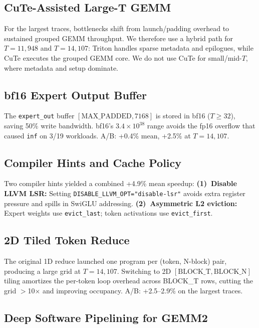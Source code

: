 \documentclass[11pt,twocolumn]{article}
\begin{document}
\subsection{CuTe-Assisted Large-T GEMM}

For the largest traces, bottlenecks shift from launch/padding overhead to sustained grouped GEMM throughput.
We therefore use a hybrid path for $T{=}11{,}948$ and $T{=}14{,}107$: Triton handles sparse metadata and epilogues, while CuTe executes the grouped GEMM core.
We do not use CuTe for small/mid-$T$, where metadata and setup dominate.

\subsection{bf16 Expert Output Buffer}

The \texttt{expert\_out} buffer $[\text{MAX\_PADDED}, 7168]$ is stored in bf16 ($T{\ge}32$), saving 50\% write bandwidth.
bf16's $3.4{\times}10^{38}$ range avoids the fp16 overflow that caused \texttt{inf} on 3/19 workloads.
A/B: +0.4\% mean, +2.5\% at $T{=}14{,}107$.

\subsection{Compiler Hints and Cache Policy}

Two compiler hints yielded a combined +4.9\% mean speedup:
\textbf{(1)~Disable LLVM LSR:}
Setting \texttt{DISABLE\_LLVM\_OPT="disable-lsr"} avoids extra register pressure and spills in SwiGLU addressing.
\textbf{(2)~Asymmetric L2 eviction:}
Expert weights use \texttt{evict\_last}; token activations use \texttt{evict\_first}.

\subsection{2D Tiled Token Reduce}

The original 1D reduce launched one program per (token, N-block) pair, producing a large grid at $T{=}14{,}107$.
Switching to 2D $[\text{BLOCK\_T}, \text{BLOCK\_N}]$ tiling amortizes the per-token loop overhead across BLOCK\_T rows, cutting the grid $>$10$\times$ and improving occupancy.
A/B: +2.5--2.9\% on the largest traces.

\subsection{Deep Software Pipelining for GEMM2}
\end{document}
